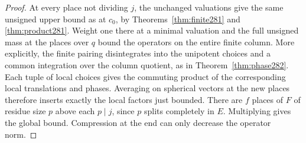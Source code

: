 \documentclass[a4paper,11pt]{article}
\theoremstyle{definition}
\theoremstyle{remark}
\numberwithin{equation}{section}
\begin{document}
\begin{proof}
At every place not dividing \(j\), the unchanged valuations
give the same unsigned upper bound as at \(c_0\), by
Theorems~\ref{thm:finite281} and \ref{thm:product281}.
Weight one there at a minimal valuation and the full
unsigned mass at the places over \(q\) bound the operators
on the entire finite column. More explicitly, the finite
pairing disintegrates into the unipotent choices and a
common integration over the column quotient, as in
Theorem~\ref{thm:phase282}. Each tuple of local choices
gives the commuting product of the corresponding local
translations and phases. Averaging on spherical vectors at
the new places therefore inserts exactly the local factors
just bounded. There are \(f\) places of \(F\) of residue
size \(p\) above each \(p\mid j\), since \(p\) splits
completely in \(E\). Multiplying gives the global bound.
Compression at the end can only decrease the operator norm.
\end{proof}
\end{document}

